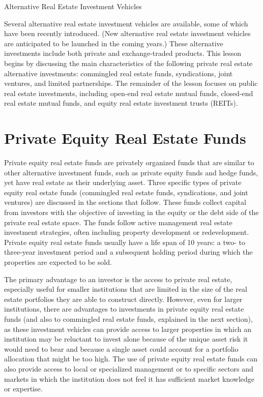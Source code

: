 \documentclass[11pt]{article}
\begin{document}
Alternative Real Estate Investment Vehicles

Several alternative real estate investment vehicles are available, some of which have been recently introduced. (New alternative real estate investment vehicles are anticipated to be launched in the coming years.) These alternative investments include both private and exchange-traded products. This lesson begins by discussing the main characteristics of the following private real estate alternative investments: commingled real estate funds, syndications, joint ventures, and limited partnerships. The remainder of the lesson focuses on public real estate investments, including open-end real estate mutual funds, closed-end real estate mutual funds, and equity real estate investment trusts (REITs).

\section*{Private Equity Real Estate Funds}
Private equity real estate funds are privately organized funds that are similar to other alternative investment funds, such as private equity funds and hedge funds, yet have real estate as their underlying asset. Three specific types of private equity real estate funds (commingled real estate funds, syndications, and joint ventures) are discussed in the sections that follow. These funds collect capital from investors with the objective of investing in the equity or the debt side of the private real estate space. The funds follow active management real estate investment strategies, often including property development or redevelopment. Private equity real estate funds usually have a life span of 10 years: a two- to three-year investment period and a subsequent holding period during which the properties are expected to be sold.

The primary advantage to an investor is the access to private real estate, especially useful for smaller institutions that are limited in the size of the real estate portfolios they are able to construct directly. However, even for larger institutions, there are advantages to investments in private equity real estate funds (and also to commingled real estate funds, explained in the next section), as these investment vehicles can provide access to larger properties in which an institution may be reluctant to invest alone because of the unique asset risk it would need to bear and because a single asset could account for a portfolio allocation that might be too high. The use of private equity real estate funds can also provide access to local or specialized management or to specific sectors and markets in which the institution does not feel it has sufficient market knowledge or expertise.
\end{document}
